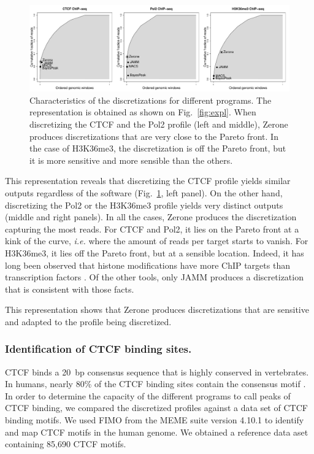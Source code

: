 \documentclass{bioinfo}
\begin{document}
\begin{figure}
\centerline{\includegraphics[scale=0.4]{pareto_front.pdf}}
\caption{
  Characteristics of the discretizations for different programs.
  The representation is obtained as shown on Fig.~\ref{fig:expl}.
  When discretizing the CTCF and the Pol2 profile (left and middle),
  Zerone produces discretizations that are very close to the Pareto
  front. In the case of H3K36me3, the discretization is off the
  Pareto front, but it is more sensitive and more sensible than the
  others.
}
\label{fig:pareto}
\end{figure}

This representation reveals that discretizing the CTCF profile yields
similar outputs regardless of the software (Fig.~\ref{fig:pareto},
left panel). On the other hand, discretizing the Pol2 or the H3K36me3
profile yields very distinct outputs (middle and right panels). In
all the cases, Zerone produces the discretization capturing the most reads.
For CTCF and Pol2, it lies on the Pareto front at a kink of the curve,
\textit{i.e.} where the amount of reads per target starts to vanish. For
H3K36me3, it lies off the Pareto front, but at a sensible location.
Indeed, it has long been observed that histone modifications have more
ChIP targets than transcription factors \citep{XXX}. Of the other tools,
only JAMM produces a discretization that is consistent with those
facts.

This representation shows that Zerone produces discretizations that
are sensitive and adapted to the profile being discretized.

\subsubsection{Identification of CTCF binding sites.}
CTCF binds a 20~bp consensus sequence that is highly conserved in
vertebrates. In humans, nearly 80\% of the CTCF binding
sites contain the consensus motif \citep{pmid17382889}. In order to
determine the capacity of the different programs to call peaks of CTCF
binding, we compared the discretized profiles against a data set of CTCF
binding motifs. We used FIMO \citep{pmid21330290} from the MEME suite
version 4.10.1 \citep{pmid19458158} to identify and map CTCF motifs in
the human genome. We obtained a reference data aset containing 85,690
CTCF motifs.
\end{document}
